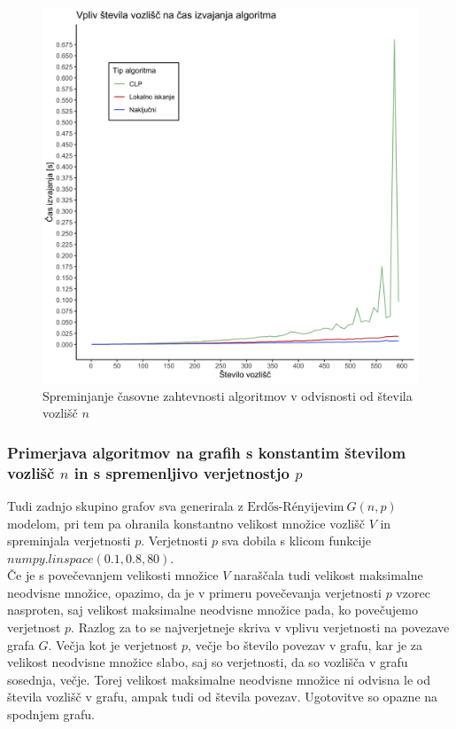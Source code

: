 \documentclass[a4paper, 12pt]{article}
\begin{document}
\begin{figure}[h!]
	\begin{center}
		\includegraphics[scale=0.11]{R_koda/voz-cas.png}
		\caption{Spreminjanje časovne zahtevnosti algoritmov v odvisnosti od števila vozlišč $n$}
	\end{center}
\end{figure}


\subsubsection{Primerjava algoritmov na grafih s konstantim številom vozlišč $n$ in s spremenljivo verjetnostjo $p$}

Tudi zadnjo skupino grafov sva generirala z $\text{Erdős-Rényijevim}\ G(n, p)$ modelom, pri tem pa ohranila konstantno velikost množice vozlišč $V$ in spreminjala verjetnosti $p$.
Verjetnosti $p$ sva dobila s klicom funkcije $numpy.linspace(0.1, 0.8, 80)$.\\

\noindent Če je s povečevanjem velikosti množice $V$ naraščala tudi velikost maksimalne neodvisne množice, opazimo, da je v primeru povečevanja verjetnosti $p$ vzorec nasproten, saj
velikost maksimalne neodvisne množice pada, ko povečujemo verjetnost $p$. Razlog za to se najverjetneje skriva v vplivu verjetnosti na povezave grafa $G$. 
Večja kot je verjetnost $p$, večje bo število povezav v grafu, kar je za velikost neodvisne množice slabo, saj so verjetnosti, da so vozlišča v grafu sosednja, večje. 
Torej velikost maksimalne neodvisne množice ni odvisna le od števila vozlišč v grafu, ampak tudi od števila povezav. Ugotovitve so opazne na spodnjem grafu.
\end{document}
